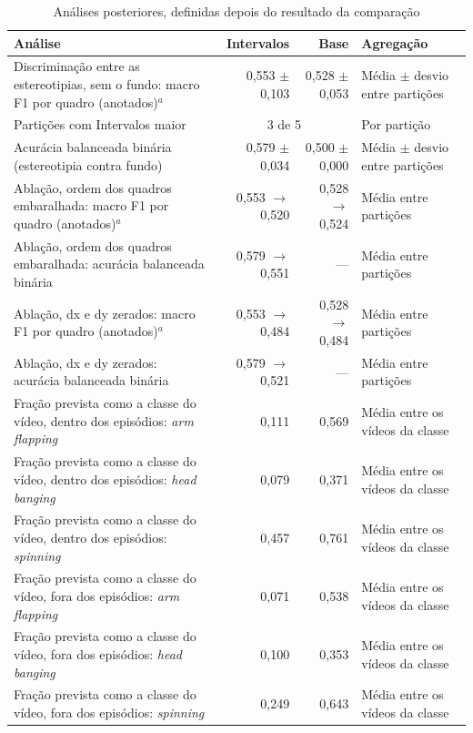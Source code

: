 \begin{table}[htbp]
\centering
\footnotesize
\caption{Análises posteriores, definidas depois do resultado da comparação}
\label{tab:posteriores}
\begin{tabular}{p{5.4cm}rrp{2.8cm}}
\toprule
Análise & Intervalos & Base & Agregação \\
\midrule
Discriminação entre as estereotipias, sem o fundo: macro F1 por quadro (anotados)$^{a}$ & 0,553 $\pm$ 0,103 & 0,528 $\pm$ 0,053 & Média $\pm$ desvio entre partições \\
Partições com Intervalos maior & \multicolumn{2}{c}{3 de 5} & Por partição \\
\midrule
Acurácia balanceada binária (estereotipia contra fundo) & 0,579 $\pm$ 0,034 & 0,500 $\pm$ 0,000 & Média $\pm$ desvio entre partições \\
\midrule
Ablação, ordem dos quadros embaralhada: macro F1 por quadro (anotados)$^{a}$ & 0,553 $\rightarrow$ 0,520 & 0,528 $\rightarrow$ 0,524 & Média entre partições \\
Ablação, ordem dos quadros embaralhada: acurácia balanceada binária & 0,579 $\rightarrow$ 0,551 & --- & Média entre partições \\
Ablação, dx e dy zerados: macro F1 por quadro (anotados)$^{a}$ & 0,553 $\rightarrow$ 0,484 & 0,528 $\rightarrow$ 0,484 & Média entre partições \\
Ablação, dx e dy zerados: acurácia balanceada binária & 0,579 $\rightarrow$ 0,521 & --- & Média entre partições \\
\midrule
Fração prevista como a classe do vídeo, dentro dos episódios: \textit{arm flapping} & 0,111 & 0,569 & Média entre os vídeos da classe \\
Fração prevista como a classe do vídeo, dentro dos episódios: \textit{head banging} & 0,079 & 0,371 & Média entre os vídeos da classe \\
Fração prevista como a classe do vídeo, dentro dos episódios: \textit{spinning} & 0,457 & 0,761 & Média entre os vídeos da classe \\
Fração prevista como a classe do vídeo, fora dos episódios: \textit{arm flapping} & 0,071 & 0,538 & Média entre os vídeos da classe \\
Fração prevista como a classe do vídeo, fora dos episódios: \textit{head banging} & 0,100 & 0,353 & Média entre os vídeos da classe \\
Fração prevista como a classe do vídeo, fora dos episódios: \textit{spinning} & 0,249 & 0,643 & Média entre os vídeos da classe \\
\bottomrule
\end{tabular}
\end{table}
